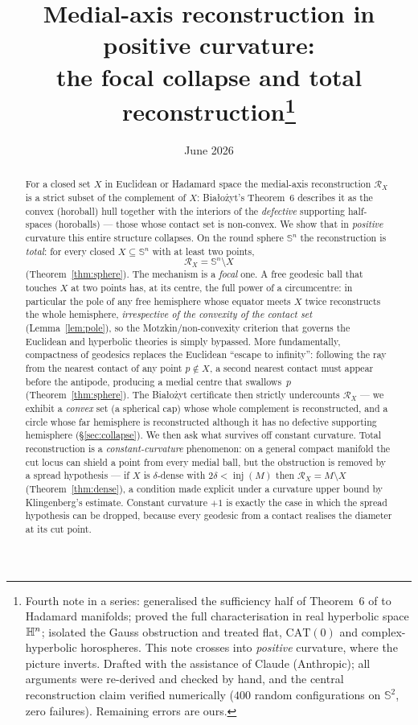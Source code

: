 \documentclass[11pt]{article}
\title{Medial-axis reconstruction in positive curvature:\\
the focal collapse and total reconstruction\thanks{Fourth note in a
series: \cite{R1} generalised the sufficiency half of Theorem~6 of
\cite{Bia} to Hadamard manifolds; \cite{R2} proved the full
characterisation in real hyperbolic space $\mathbb{H}^{n}$; \cite{R3} isolated
the Gauss obstruction and treated flat, $\mathrm{CAT}(0)$ and
complex-hyperbolic horospheres. This note crosses into \emph{positive}
curvature, where the picture inverts. Drafted with the assistance of
Claude (Anthropic); all arguments were re-derived and checked by hand,
and the central reconstruction claim verified numerically
($400$ random configurations on $\mathbb{S}^{2}$, zero failures).
Remaining errors are ours.}}
\author{}
\date{June 2026}
\theoremstyle{remark}
\newcommand{\X}{X}
\newcommand{\Rx}{\mathcal{R}_{\X}}
\newcommand{\inj}{\operatorname{inj}}
\newcommand{\Sn}{\mathbb{S}^{n}}
\begin{document}
\maketitle

\begin{abstract}
For a closed set $\X$ in Euclidean or Hadamard space the medial-axis
reconstruction $\Rx$ is a strict subset of the complement of $\X$:
Bia\l{}o\.zyt's Theorem~6 \cite{Bia} describes it as the convex
(horoball) hull together with the interiors of the \emph{defective}
supporting half-spaces (horoballs) --- those whose contact set is
non-convex. We show that in \emph{positive} curvature this entire
structure collapses. On the round sphere $\Sn$ the reconstruction is
\emph{total}: for every closed $\X\subseteq\Sn$ with at least two points,
\[
  \boxed{\ \Rx=\Sn\setminus\X\ }
\]
(Theorem~\ref{thm:sphere}). The mechanism is a \emph{focal} one. A free
geodesic ball that touches $\X$ at two points has, at its centre, the
full power of a circumcentre: in particular the pole of any free
hemisphere whose equator meets $\X$ twice reconstructs the whole
hemisphere, \emph{irrespective of the convexity of the contact set}
(Lemma~\ref{lem:pole}), so the Motzkin/non-convexity criterion that
governs the Euclidean and hyperbolic theories is simply bypassed. More
fundamentally, compactness of geodesics replaces the Euclidean
``escape to infinity'': following the ray from the nearest contact of any
point $p\notin\X$, a second nearest contact must appear before the
antipode, producing a medial centre that swallows~$p$
(Theorem~\ref{thm:sphere}). The Bia\l{}o\.zyt certificate then strictly
undercounts $\Rx$ --- we exhibit a \emph{convex} set (a spherical cap)
whose whole complement is reconstructed, and a circle whose far
hemisphere is reconstructed although it has no defective supporting
hemisphere (\S\ref{sec:collapse}). We then ask what survives off constant
curvature. Total reconstruction is a \emph{constant-curvature}
phenomenon: on a general compact manifold the cut locus can shield a
point from every medial ball, but the obstruction is removed by a spread
hypothesis --- if $\X$ is $\delta$-dense with $2\delta<\inj(M)$ then
$\Rx=M\setminus\X$ (Theorem~\ref{thm:dense}), a condition made explicit
under a curvature upper bound by Klingenberg's estimate. Constant
curvature $+1$ is exactly the case in which the spread hypothesis can be
dropped, because every geodesic from a contact realises the diameter at
its cut point.
\end{abstract}
\end{document}

